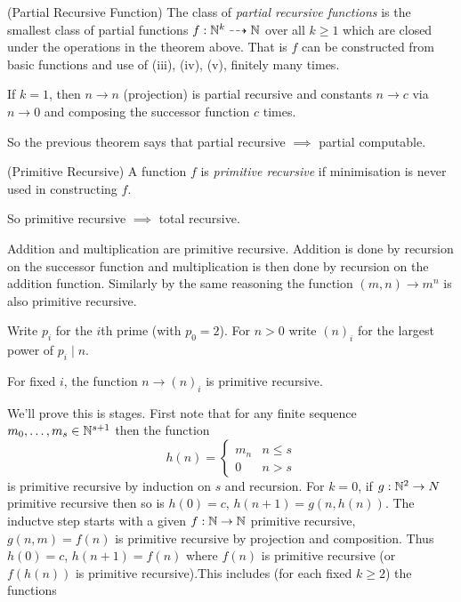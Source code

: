 \documentclass[tikx, border = 10pt]{article}
\begin{document}
\begin{definition}
	(Partial Recursive Function) The class of \textit{partial recursive functions} is the smallest class of partial functions $ f: \mathbb{N}^k \dashrightarrow \mathbb{N} $ over all $ k \ge 1 $ which are closed under the operations in the theorem above. That is $ f $ can be constructed from basic functions and use of (iii), (iv), (v), finitely many times. 
\end{definition}
\begin{example}
  If $ k = 1 $, then $ n \to n $ (projection) is partial recursive and constants $ n \to c $ via $ n \to 0 $ and composing the successor function $ c $ times.
\end{example}
So the previous theorem says that partial recursive $ \implies $ partial computable. 
\begin{definition}
	(Primitive Recursive) A function $ f $ is \textit{primitive recursive} if minimisation is never used in constructing $ f $. 
\end{definition}
So primitive recursive $ \implies $ total recursive.
\begin{example}
  Addition and multiplication are primitive recursive. Addition is done by recursion on the successor function and multiplication is then done by recursion on the addition function. Similarly by the same reasoning the function $ (m,n) \to m^n $ is also primitive recursive.
\end{example}
\begin{definition}
  Write $ p_i $ for the $ i $th prime (with $ p_0 = 2 $). For $ n > 0 $ write $ (n)_i $ for the largest power of $ p_i \mid n $.
\end{definition}
\begin{lemma}
  For fixed $ i $, the function $ n \to (n)_i $ is primitive recursive.
\end{lemma}
\pf We'll prove this is stages. First note that for any finite sequence $ m_0,\dots, m_s \in \mathbb{N}^{s+1} $ then the function
\[
  h(n) = \begin{cases}
	  m_n & n \le s \\
	  0 & n > s
  \end{cases}
\]
is primitive recursive by induction on $ s $ and recursion. For $ k=0 $, if $ g: \mathbb{N}^2 \to N $ primitive recursive then so is $ h(0) = c $, $ h(n+1) = g(n,h(n)) $. The inductve step starts with a given $ f: \mathbb{N} \to \mathbb{N} $ primitive recursive, $ g(n,m) = f(n) $ is primitive recursive by projection and composition.  Thus $ h(0) = c $, $ h(n+1) = f(n) $ where $ f(n) $ is primitive recursive (or $ f(h(n)) $ is primitive recursive).This includes (for each fixed $ k \ge 2 $) the functions
\end{document}
